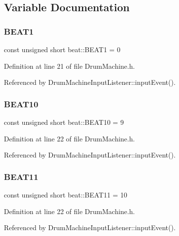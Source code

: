 \subsection{Variable Documentation}
\mbox{\label{namespacebeat_ae859561033de8f2140542a8bea7d5f02}} 
\subsubsection{\texorpdfstring{B\+E\+A\+T1}{BEAT1}}
{\footnotesize\ttfamily const unsigned short beat\+::\+B\+E\+A\+T1 = 0}



Definition at line 21 of file Drum\+Machine.\+h.



Referenced by Drum\+Machine\+Input\+Listener\+::input\+Event().

\mbox{\label{namespacebeat_abd0eb0f3160a3579b574ffa8bf94282c}} 
\subsubsection{\texorpdfstring{B\+E\+A\+T10}{BEAT10}}
{\footnotesize\ttfamily const unsigned short beat\+::\+B\+E\+A\+T10 = 9}



Definition at line 22 of file Drum\+Machine.\+h.



Referenced by Drum\+Machine\+Input\+Listener\+::input\+Event().

\mbox{\label{namespacebeat_a4ba76b47d18db4674af1ca28136614e2}} 
\subsubsection{\texorpdfstring{B\+E\+A\+T11}{BEAT11}}
{\footnotesize\ttfamily const unsigned short beat\+::\+B\+E\+A\+T11 = 10}



Definition at line 22 of file Drum\+Machine.\+h.



Referenced by Drum\+Machine\+Input\+Listener\+::input\+Event().

